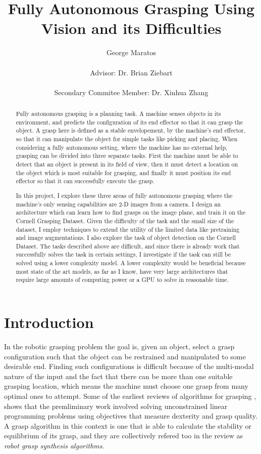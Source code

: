 \documentclass{article}
\title{Fully Autonomous Grasping Using Vision and its Difficulties}
\author{George Maratos\\\\Advisor: Dr. Brian Ziebart\\\\Secondary Commitee Member: Dr. Xinhua Zhang}
\begin{document}
\maketitle

\newpage
\begin{abstract}
Fully autonomous grasping is a planning task. A machine senses objects in its
environment, and predicts the configuration of its end effector so that it can
grasp the object. A grasp here is defined as a stable envelopement, by the machine's
end effector, so that it can manipulate the object for simple tasks like picking
and placing. When considering a fully autonomous setting, where the machine has no
external help, grasping can be divided into three separate tasks. First the machine
must be able to detect that an object is present in its field of view, then it must
detect a location on the object which is most suitable for grasping, and finally
it must position its end effector so that it can successfully execute the grasp.

In this project, I explore these three areas of fully autonomous grasping where the
machine's only sensing capabilities are 2-D images from a camera. I design an
architecture which can learn how to find grasps on the image plane, and train it
on the Cornell Grasping Dataset. Given the difficulty of the task and the
small size of the dataset, I employ techniques to extend the utility of the
limited data like pretraining and image augmentations. I also explore the task
of object detection on the Cornell Dataset. The tasks described above are
difficult, and since there is already work that successfully solves the task
in certain settings, I investigate if the task can still be solved
using a lower complexity model. A lower complexity would be beneficial because
most state of the art models, as far as I know, have very large architectures
that require large amounts of computing power or a GPU to solve in reasonable time.

\end{abstract}

\newpage
\section{Introduction}
In the robotic grasping problem the goal is, given an object, select a grasp
configuration such that the object can be restrained and
manipulated to some desirable end. Finding such configurations is difficult
because of the multi-modal nature of the input and the fact that there can be
more than one suitable grasping location, which means the machine must choose
one grasp from many optimal ones to attempt.
Some of the earliest reviews of algorithms for grasping \cite{shimoga96,bicchi00},
shows that the premliminary work involved solving unconstrained linear programming
problems using objectives that measure dexterity and grasp quality. A grasp
algorithm in this context is one that is able to calculate the stability or
equilibrium of its grasp, and they are collectively refered too in the
review as \textit{robot grasp synthesis algorithms}.
\end{document}
